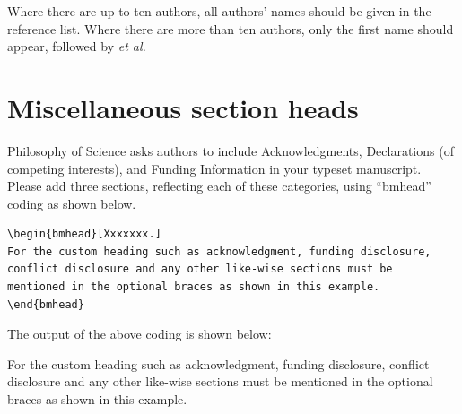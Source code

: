 \documentclass[lineno]{JFM-FLM_Au}
\begin{document}
Where there are up to ten authors, all authors' names should be given in the reference list. Where there are more than ten authors, only the first name should appear, followed by {\it {et al.}}


\section{Miscellaneous section heads}

Philosophy of Science asks authors to include Acknowledgments, Declarations (of competing interests), and Funding Information in your typeset manuscript.  Please add three sections, reflecting each of these categories, using ``bmhead'' coding as shown below.

\begin{verbatim}
\begin{bmhead}[Xxxxxxx.]
For the custom heading such as acknowledgment, funding disclosure,
conflict disclosure and any other like-wise sections must be
mentioned in the optional braces as shown in this example.
\end{bmhead}
\end{verbatim}
The output of the above coding is shown below:

\begin{bmhead}[Xxxxxxx.]
For the custom heading such as acknowledgment, funding disclosure,
conflict disclosure and any other like-wise sections must be
mentioned in the optional braces as shown in this example.
\end{bmhead}
\end{document}
